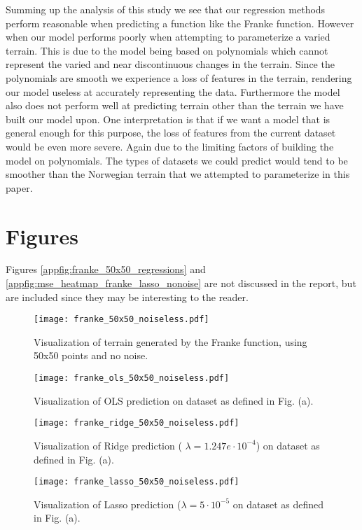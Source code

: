 \documentclass[%
 reprint,
nofootinbib,
 amsmath,amssymb,
 aps,
]{revtex4-2}
\begin{document}
Summing up the analysis of this study we see that our regression methods perform reasonable when predicting a function like the Franke function. However when our model performs poorly when attempting to parameterize a varied terrain. This is due to the model being based on polynomials which cannot represent the varied and near discontinuous changes in the terrain. Since the polynomials are smooth we experience a loss of features in the terrain, rendering our model useless at accurately representing the data. Furthermore the model also does not perform well at predicting terrain other than the terrain we have built our model upon. One interpretation is that if we want a model that is general enough for this purpose, the loss of features from the current dataset would be even more severe. Again due to the limiting factors of building the model on polynomials. The types of datasets we could predict would tend to be smoother than the Norwegian terrain that we attempted to parameterize in this paper.

\appendix

\section{Figures}
Figures \ref{appfig:franke_50x50_regressions} and \ref{appfig:mse_heatmap_franke_lasso_nonoise} are not discussed in the report, but are included since they may be interesting to the reader.


\begin{figure*}[t]
\centering
\begin{subfigure}{.5\textwidth}
    \centering
    \texttt{[image: franke\_50x50\_noiseless.pdf]}
    \caption[short]{Visualization of terrain generated by the Franke function, using 50x50 points and no noise.}
\end{subfigure}%
\begin{subfigure}{.5\textwidth}
    \centering
    \texttt{[image: franke\_ols\_50x50\_noiseless.pdf]}
    \caption[short]{Visualization of OLS prediction on dataset as defined in Fig. (a).}
\end{subfigure}
\begin{subfigure}{.5\textwidth}
    \centering
    \texttt{[image: franke\_ridge\_50x50\_noiseless.pdf]}
    \caption[short]{Visualization of Ridge prediction ( $\lambda = 1.247e \cdot 10^{-4}$) on dataset as defined in Fig. (a).}
\end{subfigure}%
\begin{subfigure}{.5\textwidth}
    \centering
    \texttt{[image: franke\_lasso\_50x50\_noiseless.pdf]}
    \caption[short]{Visualization of Lasso prediction ($\lambda = 5 \cdot 10^{-5}$ on dataset as defined in Fig. (a).}
\end{subfigure}
\centering\caption[short]{\label{appfig:franke_50x50_regressions} Different types of regression on the Franke function.}
\end{figure*}
\end{document}
